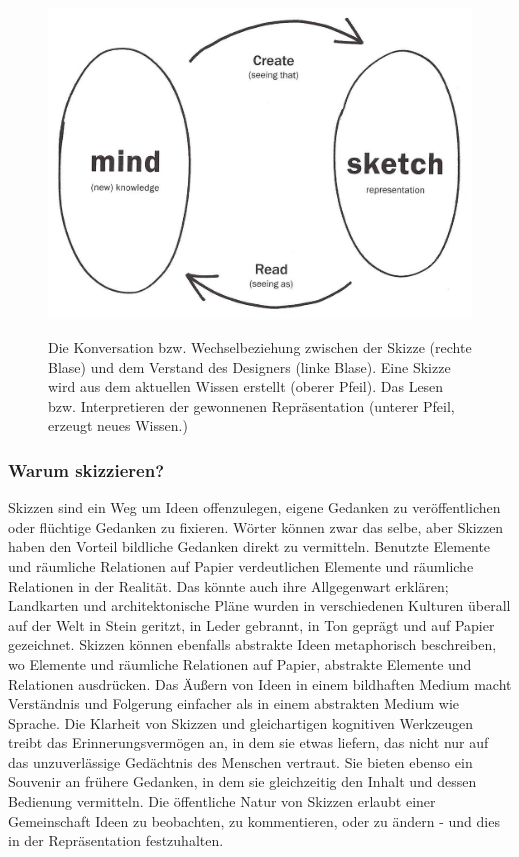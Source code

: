 \begin{figure}
	\begin{center}
        {\includegraphics[width=1\linewidth]{gfx/buxtonSketchDialogue}}
	\end{center}
		\caption[Die Skizzierwechselbeziehung. \newline \citep{Buxton:2007}]{Die Konversation bzw. Wechselbeziehung zwischen der Skizze (rechte Blase) und dem Verstand des Designers (linke Blase). Eine Skizze wird aus dem aktuellen Wissen erstellt (oberer Pfeil). Das Lesen bzw. Interpretieren der gewonnenen Repräsentation (unterer Pfeil, erzeugt neues Wissen.)}\label{fig:buxtonSketchDialogue}
\end{figure}

\subsubsection{Warum skizzieren?} 
Skizzen sind ein Weg um Ideen offenzulegen, eigene Gedanken zu veröffentlichen oder flüchtige Gedanken zu fixieren. Wörter können zwar das selbe, aber Skizzen haben den Vorteil bildliche Gedanken direkt zu vermitteln. Benutzte Elemente und räumliche Relationen auf Papier verdeutlichen Elemente und räumliche Relationen in der Realität. Das könnte auch ihre Allgegenwart erklären; Landkarten und architektonische Pläne wurden in verschiedenen Kulturen überall auf der Welt in Stein geritzt, in Leder gebrannt, in Ton geprägt und auf Papier gezeichnet. Skizzen können ebenfalls abstrakte Ideen metaphorisch beschreiben, wo Elemente und räumliche Relationen auf Papier, abstrakte Elemente und Relationen ausdrücken. Das Äußern von Ideen in einem bildhaften Medium macht Verständnis und Folgerung einfacher als in einem abstrakten Medium wie Sprache. Die Klarheit von Skizzen und gleichartigen kognitiven Werkzeugen treibt das Erinnerungsvermögen an, in dem sie etwas liefern, das nicht nur auf das unzuverlässige Gedächtnis des Menschen vertraut. Sie bieten ebenso ein Souvenir an frühere Gedanken, in dem sie gleichzeitig den Inhalt und dessen Bedienung vermitteln. Die öffentliche Natur von Skizzen erlaubt einer Gemeinschaft Ideen zu beobachten, zu kommentieren, oder zu ändern - und dies in der Repräsentation festzuhalten.

